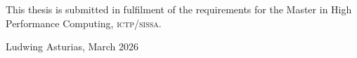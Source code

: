 \begin{dedication}





  This thesis is submitted in fulfilment of the requirements for the Master in High Performance Computing, \textsc{ictp/sissa}.


\begin{center}
    

Ludwing Asturias, March 2026
\end{center}

\begin{center}
    

\vspace*{\fill}%



\end{center}







\end{dedication}



